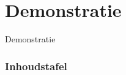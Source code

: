 \documentclass{beamer}
\begin{document}
\section{Demonstratie}
\begin{frame}[c]
  \begin{center}
    \Huge Demonstratie
  \end{center}
\end{frame}



\begin{frame}[label=FINAL_TOC]
  \begin{multicols}{2}
    \frametitle{Inhoudstafel}
    \tableofcontents[]
  \end{multicols}
\end{frame}
\end{document}
